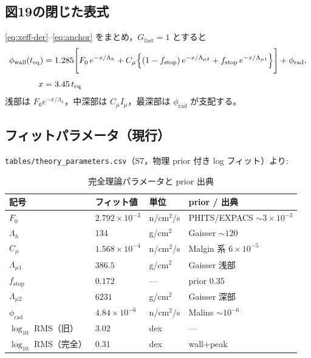 \documentclass[a4paper,11pt]{ltjsarticle}
\begin{document}
\subsection{図19の閉じた表式}

\eqref{eq:xeff-der}--\eqref{eq:anchor} をまとめ，$G_{\mathrm{fast}}=1$ とすると
\begin{equation}
\begin{aligned}
  \phi_{\mathrm{wall}}(t_{\mathrm{eq}})
  &= 1.285\Biggl[
    F_0\,e^{-x/\Lambda_h}
    + C_\mu\Bigl\{
      (1-f_{\mathrm{stop}})\,e^{-x/\Lambda_{\mu 2}}
      + f_{\mathrm{stop}}\,e^{-x/\Lambda_{\mu 1}}
    \Bigr\}
  \Biggr]
  + \phi_{\mathrm{rad}},
  \\[0.35em]
  x &= 3.45\,t_{\mathrm{eq}}
\end{aligned}
\label{eq:complete-fig19}
\end{equation}
浅部は $F_0 e^{-x/\Lambda_h}$，中深部は $C_\mu I_\mu$，最深部は $\phi_{\mathrm{rad}}$ が支配する。

\subsection{フィットパラメータ（現行）}

\texttt{tables/theory\_parameters.csv}（S7，物理 prior 付き log フィット）より:

\begin{table}[htbp]
  \centering
  \caption{完全理論パラメータと prior 出典}
  \label{tab:params}
  \begin{tabular}{llll}
    \toprule
    記号 & フィット値 & 単位 & prior / 出典 \\
    \midrule
    $F_0$ & $2.792\times10^{-3}$ & n/cm$^2$/s & PHITS/EXPACS $\sim3\times10^{-3}$ \\
    $\Lambda_h$ & $134$ & g/cm$^2$ & Gaisser $\sim120$ \\
    $C_\mu$ & $1.568\times10^{-4}$ & n/cm$^2$/s & Malgin 系 $6\times10^{-5}$ \\
    $\Lambda_{\mu 1}$ & $386.5$ & g/cm$^2$ & Gaisser 浅部 \\
    $f_{\mathrm{stop}}$ & $0.172$ & --- & prior $0.35$ \\
    $\Lambda_{\mu 2}$ & $6231$ & g/cm$^2$ & Gaisser 深部 \\
    $\phi_{\mathrm{rad}}$ & $4.84\times10^{-6}$ & n/cm$^2$/s & Malins $\sim10^{-6}$ \\
    \midrule
    $\log_{10}$ RMS（旧） & $3.02$ & dex & --- \\
    $\log_{10}$ RMS（完全） & $0.31$ & dex & wall+peak \\
    \bottomrule
  \end{tabular}
\end{table}
\end{document}
